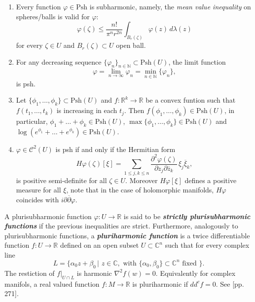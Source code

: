 \documentclass[12pt,twoside,a4paper]{report}
\newcommand{\nat}{\ensuremath{ \mathbb N }}
\newcommand{\re}{\ensuremath{\mathbb R }}
\newcommand{\co}{\ensuremath{\mathbb C }}
\newcommand{\con}{\ensuremath{\mathbb{C}^n}}
\newcommand{\dd}{\ensuremath{\partial\overline{\partial}}}
\newcommand{\psh}{\ensuremath{\mathrm{Psh}}}
\newcommand{\csheaf}{\ensuremath{\mathcal C }}
\begin{document}
  \begin{enumerate}
    \item Every function \(\varphi\in\psh\) is subharmonic, namely, the \emph{mean value inequality} on spheres/balls is valid for \(\varphi\):
          \begin{equation}
            \varphi(\zeta)\leq\frac{n!}{\pi^nr^{2n}}\int_{B_r(\zeta)}\varphi(z)\,d\lambda(z)
          \end{equation}
      for every  \(\zeta\in U\) and \(B_r(\zeta)\subset U\) open ball.
    \item For any decreasing sequence \(\{\varphi_n\}_{n\in\nat}\subset\psh(U)\), the limit function
          \[
          \varphi=\lim_{n\to\infty}\varphi_n=\min_{n\in\nat}\{\varphi_n\},
          \]
      is psh.
    \item Let \(\{\phi_1,\dots,\phi_k\}\subset\psh(U)\) and \(f:\re^k\to\re\) be a convex funtion such that \(f(t_1,\dots,t_k)\) is increasing in each \(t_j\). Then \(f(\phi_1,\dots,\phi_k)\in\psh(U)\), in particular, \(\phi_1+\dots+\phi_k\in\psh(U)\), \(\max\{\phi_1,\dots,\phi_k\}\in\psh(U)\) and \(\log(e^{\phi_1}+\dots+e^{\phi_k})\in\psh(U)\).
    \item \(\varphi\in\csheaf^2(U)\) is psh if and only if the Hermitian form
      \begin{equation}
        H\varphi(\zeta)[\xi]=\sum_{1\leq j,k\leq n}\dfrac{\partial^2\varphi(\zeta)}{\partial z_j\partial\overline{z}_k}\,\xi_j\overline{\xi}_k,
      \end{equation}
          is positive semi-definite for all \(\zeta\in U\). Moreover \(H\varphi[\xi]\) defines a positive measure for all \(\xi\), note that in the case of holomorphic manifolds, \(H\varphi\) coincides with \(i\dd\varphi\).
  \end{enumerate}

  \noindent A plurisubharmonic function $\varphi:U\to\re$ is said to be \emph{\textbf{strictly plurisubharmonic functions}} if the previous inequalities are strict. Furthermore, analogously to plurisubharmonic functions, a \emph{\textbf{pluriharmonic function}} is a twice differentiable function \(f:U\to\re\) defined on an open subset \(U\subset\con\) such that for every complex line
    \[
      L=\{\alpha_0 z+\beta_0\,|\,\,z\in\co,\text{ with }\{\alpha_0,\beta_0\}\subset\con\text{ fixed }\}.
    \]
    The restiction of \(f|_{U\cap L}\) is harmonic $\nabla^2f(w)=0$. Equivalently for complex manifols, a real valued function \hbox{$f:M\to\re$} is pluriharmonic if $dd^{c}f=0$. See \cite{Gunning-Rossi}[pp. 271].
\end{document}
